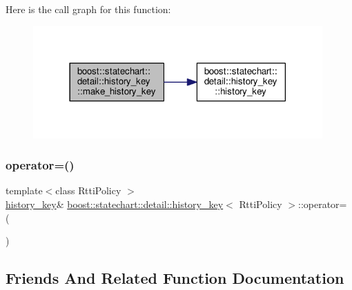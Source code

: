 Here is the call graph for this function\+:
\nopagebreak
\begin{figure}[H]
\begin{center}
\leavevmode
\includegraphics[width=314pt]{classboost_1_1statechart_1_1detail_1_1history__key_aefbb3ffada8c42f5c5f5a9e464341452_cgraph}
\end{center}
\end{figure}
\mbox{\label{classboost_1_1statechart_1_1detail_1_1history__key_a07231e51068dc3259efdc07e343d0483}} 
\subsubsection{\texorpdfstring{operator=()}{operator=()}}
{\footnotesize\ttfamily template$<$class Rtti\+Policy $>$ \\
\mbox{\hyperlink{classboost_1_1statechart_1_1detail_1_1history__key}{history\+\_\+key}}\& \mbox{\hyperlink{classboost_1_1statechart_1_1detail_1_1history__key}{boost\+::statechart\+::detail\+::history\+\_\+key}}$<$ Rtti\+Policy $>$\+::operator= (\begin{DoxyParamCaption}\item[{const \mbox{\hyperlink{classboost_1_1statechart_1_1detail_1_1history__key}{history\+\_\+key}}$<$ Rtti\+Policy $>$ \&}]{ }\end{DoxyParamCaption})\hspace{0.3cm}{\ttfamily [private]}}



\subsection{Friends And Related Function Documentation}
\mbox{\label{classboost_1_1statechart_1_1detail_1_1history__key_ac8d9c052e17afa2f6a17530fd0fd25de}} 
